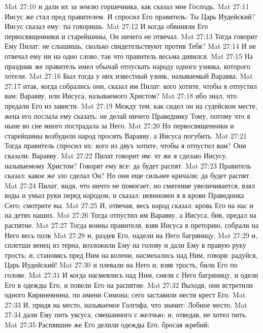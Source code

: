\vs Mat 27:10 и дали их за землю горшечника, как сказал мне Господь.
\rsbpar\vs Mat 27:11 Иисус же стал пред правителем. И спросил Его правитель: Ты Царь Иудейский? Иисус сказал ему: ты говоришь.
\vs Mat 27:12 И когда обвиняли Его первосвященники и старейшины, Он ничего не отвечал.
\vs Mat 27:13 Тогда говорит Ему Пилат: не слышишь, сколько свидетельствуют против Тебя?
\vs Mat 27:14 И не отвечал ему ни на одно слово, так что правитель весьма дивился.
\vs Mat 27:15 На праздник же  правитель имел обычай отпускать народу одного узника, которого хотели.
\vs Mat 27:16 Был тогда у них известный узник, называемый Варавва;
\vs Mat 27:17 итак, когда собрались они, сказал им Пилат: кого хотите, чтобы я отпустил вам: Варавву, или Иисуса, называемого Христом?
\vs Mat 27:18 ибо знал, что предали Его из зависти.
\vs Mat 27:19 Между тем, как сидел он на судейском месте, жена его послала ему сказать: не делай ничего Праведнику Тому, потому что я ныне во сне много пострадала за Него.
\vs Mat 27:20 Но первосвященники и старейшины возбудили народ просить Варавву, а Иисуса погубить.
\vs Mat 27:21 Тогда правитель спросил их: кого из двух хотите, чтобы я отпустил вам? Они сказали: Варавву.
\vs Mat 27:22 Пилат говорит им: чт же я сделаю Иисусу, называемому Христом? Говорят ему все: да будет распят.
\vs Mat 27:23 Правитель сказал: какое же зло сделал Он? Но они еще сильнее кричали: да будет распят.
\vs Mat 27:24 Пилат, видя, что ничто не помогает, но смятение увеличивается, взял воды и умыл руки перед народом, и сказал: невиновен я в крови Праведника Сего; смотрите вы.
\vs Mat 27:25 И, отвечая, весь народ сказал: кровь Его на нас и на детях наших.
\vs Mat 27:26 Тогда отпустил им Варавву, а Иисуса, бив, предал на распятие.
\rsbpar\vs Mat 27:27 Тогда воины правителя, взяв Иисуса в преторию, собрали на Него весь полк
\vs Mat 27:28 и, раздев Его, надели на Него багряницу;
\vs Mat 27:29 и, сплетши венец из терна, возложили Ему на голову и дали Ему в правую руку трость; и, становясь пред Ним на колени, насмехались над Ним, говоря: радуйся, Царь Иудейский!
\vs Mat 27:30 и плевали на Него и, взяв трость, били Его по голове.
\rsbpar\vs Mat 27:31 И когда насмеялись над Ним, сняли с Него багряницу, и одели Его в одежды Его, и повели Его на распятие.
\vs Mat 27:32 Выходя, они встретили одного Киринеянина, по имени Симона; сего заставили нести крест Его.
\vs Mat 27:33 И, придя на место, называемое Голгофа, что значит: Лобное место,
\vs Mat 27:34 дали Ему пить уксуса, смешанного с желчью; и, отведав, не хотел пить.
\vs Mat 27:35 Распявшие же Его делили одежды Его, бросая жребий;
